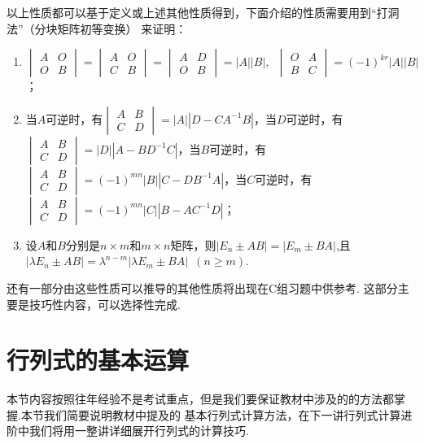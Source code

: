 以上性质都可以基于定义或上述其他性质得到，下面介绍的性质需要用到``打洞法''（分块矩阵初等变换）
来证明：

\begin{enumerate}
    \item $\begin{vmatrix}
        A & O \\ O & B
    \end{vmatrix} = \begin{vmatrix}
        A & O \\ C & B
    \end{vmatrix} = \begin{vmatrix}
        A & D \\ O & B
    \end{vmatrix} = |A||B|,\enspace\begin{vmatrix}
        O & A \\ B & C
    \end{vmatrix} = (-1)^{kr}|A||B|$；

    \item 当$A$可逆时，有$\begin{vmatrix}
        A & B \\ C & D
    \end{vmatrix} = |A||D-CA^{-1}B|$，当$D$可逆时，有
    $\begin{vmatrix}
        A & B \\ C & D
    \end{vmatrix} = |D||A-BD^{-1}C|$，当$B$可逆时，有
    $\begin{vmatrix}
        A & B \\ C & D
    \end{vmatrix} = (-1)^{mn}|B||C-DB^{-1}A|$，当$C$可逆时，有
    $\begin{vmatrix}
        A & B \\ C & D
    \end{vmatrix} = (-1)^{mn}|C||B-AC^{-1}D|$；

    \item 设$A$和$B$分别是$n \times m$和$m \times n$矩阵，则$|E_n \pm AB|=|E_m \pm BA|$,且
    $|\lambda E_n \pm AB|=\lambda^{n-m}|\lambda E_m \pm BA|\enspace(n \geqslant m)$.
\end{enumerate}

还有一部分由这些性质可以推导的其他性质将出现在C组习题中供参考. 这部分主要是技巧性内容，可以选择性完成.

\section{行列式的基本运算}
本节内容按照往年经验不是考试重点，但是我们要保证教材中涉及的的方法都掌握.本节我们简要说明教材中提及的
基本行列式计算方法，在下一讲行列式计算进阶中我们将用一整讲详细展开行列式的计算技巧.

